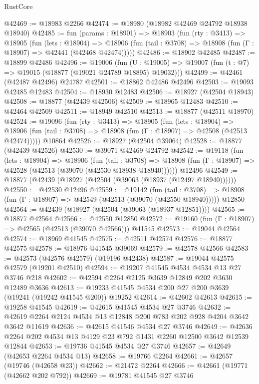 \begin{lexlean}{RustCore}
\begin{coremodule}
@42469 := @18983 @2266
@42474 := @18980 (@18982 @42469 @24792 @18938 @18940)
@42485 := fun (params : @18901) =>
  @18903
    (fun (rty : @3413) =>
    @18905
      (fun (lets : @18904) =>
      @18906 (fun (tail : @3708) => @18908 (fun (Γ : @18907) => @42441 (@42468 @42474)))))
@42486 := @18902 @42485
@42487 := @18899 @42486
@42496 := @19006
    (fun (U : @19005) => @19007 (fun (t : @7) => @19015 (@18877 (@19021 @24789 @18895) @19032)))
@42499 := @42461 (@42487 @42496) @24787
@42501 := @18862 @42486 @42496
@42503 := @19093 @42485 @12483
@42504 := @18930 @12483
@42506 := @18927 (@42504 @18943)
@42508 := @18877 (@42439 @42506)
@42509 := @18965 @12483
@42510 := @42464 @42509
@42511 := @18949 @42510
@42513 := @18877 (@42511 @18970)
@42524 := @19096
    (fun (rty : @3413) =>
    @18905
      (fun (lets : @18904) =>
      @18906 (fun (tail : @3708) => @18908 (fun (Γ : @18907) => @42508 (@42513 @42474)))))
    @10864
@42526 := @18927 (@42504 @39064)
@42528 := @18877 (@42439 @42526)
@42530 := @39071 @42469 @24792
@42542 := @19118
    (fun (lets : @18904) =>
    @18906
      (fun (tail : @3708) =>
      @18908 (fun (Γ : @18907) => @42528 (@42513 (@39070 (@42530 @18938 @18940))))))
    @12496
@42549 := @18877 (@42439 (@18927 (@42504 (@39063 (@18937 (@12497 @18940))))))
@42550 := @42530 @12496
@42559 := @19142
    (fun (tail : @3708) => @18908 (fun (Γ : @18907) => @42549 (@42513 (@39070 (@42550 @18940)))))
    @12850
@42564 := @42439 (@18927 (@42504 (@39063 (@18937 @12851))))
@42565 := @18877 @42564
@42566 := @42550 @12850
@42572 := @19160 (fun (Γ : @18907) => @42565 (@42513 (@39070 @42566))) @41545
@42573 := @19044 @42564
@42574 := @18969 @41545
@42575 := @42511 @42574
@42576 := @18877 @42575
@42578 := @18976 @41545 @39069
@42579 := @42578 @42566
@42583 := @42573 (@42576 @42579) (@19196 @42438)
@42587 := @19044 @42575 @42579 (@19201 @42510)
@42594 := @19207 @41545 @4534 @4534 @13 @27 @3746 @218
@42602 := @42594 @2264 @2125 @3639 @12849 @202 @3630 @12489 @3636
@42613 := @19233 @41545 @4534 @200 @27 @200 @3639 (@19241 (@19242 @41545 @200)) @19252
@42614 := @42602 @42613
@42615 := @19258 @41545
@42619 := @42615 @41545 @4534 @27 @3746
@42632 := @42619 @2264 @2124 @4534 @13 @12848 @200 @783 @202 @928 @4204 @3642 @3642 @11619
@42636 := @42615 @41546 @4534 @27 @3746
@42649 := @42636 @2264 @202 @4534 @13 @4129 @23 @792 @1431 @2260 @12500 @3642 @12539 @12844
@42653 := @19736 @41545 @4534 @27 @3746
@42657 := @42649 (@42653 @2264 @4534 @13)
@42658 := @19766 @2264
@42661 := @42657 (@19746 (@42658 @23))
@42662 := @21472 @2264
@42666 := @42661 (@19771 (@42662 @202 @792))
@42669 := @19781 @41545 @27 @3746

\end{coremodule}
\end{lexlean}
